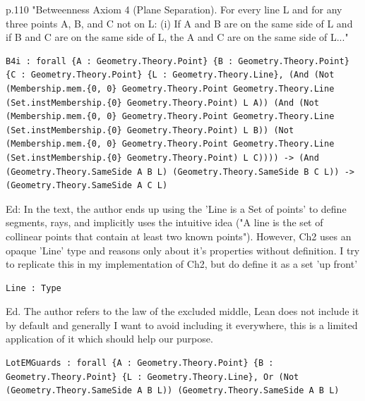 \begin{lemma}
  \label{Geometry.Theory.B4i}
  \leanok
  p.110 "Betweenness Axiom 4 (Plane Separation). For every line L and for any three points A, B, and C not on L: (i) If A and B are on the same side of L and if B and C are on the same side of L, the A and C are on the same side of L..." 
\begin{verbatim}B4i : forall {A : Geometry.Theory.Point} {B : Geometry.Theory.Point} {C : Geometry.Theory.Point} {L : Geometry.Theory.Line}, (And (Not (Membership.mem.{0, 0} Geometry.Theory.Point Geometry.Theory.Line (Set.instMembership.{0} Geometry.Theory.Point) L A)) (And (Not (Membership.mem.{0, 0} Geometry.Theory.Point Geometry.Theory.Line (Set.instMembership.{0} Geometry.Theory.Point) L B)) (Not (Membership.mem.{0, 0} Geometry.Theory.Point Geometry.Theory.Line (Set.instMembership.{0} Geometry.Theory.Point) L C)))) -> (And (Geometry.Theory.SameSide A B L) (Geometry.Theory.SameSide B C L)) -> (Geometry.Theory.SameSide A C L)\end{verbatim}
\end{lemma}

\begin{definition}
  \label{Geometry.Theory.Line}
  \leanok
  Ed: In the text, the author ends up using the 'Line is a Set of points' to define segments, rays, and implicitly uses the intuitive idea ("A line is the set of collinear points that contain at least two known points"). However, Ch2 uses an opaque 'Line' type and reasons only about it's properties without definition. I try to replicate this in my implementation of Ch2, but do define it as a set 'up front' 
\begin{verbatim}Line : Type\end{verbatim}
\end{definition}

\begin{lemma}
  \label{Geometry.Theory.LotEMGuards}
  \leanok
  Ed. The author refers to the law of the excluded middle, Lean does not include it by default and generally I want to avoid including it everywhere, this is a limited application of it which should help our purpose. 
\begin{verbatim}LotEMGuards : forall {A : Geometry.Theory.Point} {B : Geometry.Theory.Point} {L : Geometry.Theory.Line}, Or (Not (Geometry.Theory.SameSide A B L)) (Geometry.Theory.SameSide A B L)\end{verbatim}
\end{lemma}

